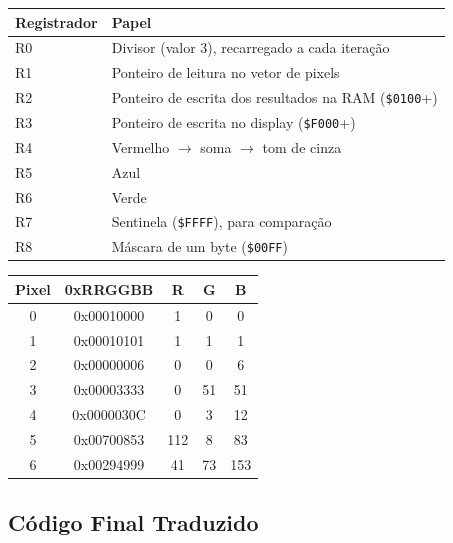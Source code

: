 \documentclass[12pt, a4paper]{article}
\begin{document}
\begin{table}[h!]
\centering
\begin{tabularx}{\textwidth}{lX}
  \toprule
  \textbf{Registrador} & \textbf{Papel} \\
  \midrule
  R0 & Divisor (valor 3), recarregado a cada iteração \\
  R1 & Ponteiro de leitura no vetor de pixels \\
  R2 & Ponteiro de escrita dos resultados na RAM (\texttt{\$0100}+) \\
  R3 & Ponteiro de escrita no display (\texttt{\$F000}+) \\
  R4 & Vermelho $\rightarrow$ soma $\rightarrow$ tom de cinza \\
  R5 & Azul \\
  R6 & Verde \\
  R7 & Sentinela (\texttt{\$FFFF}), para comparação \\
  R8 & Máscara de um byte (\texttt{\$00FF}) \\
  \bottomrule
\end{tabularx}
\end{table}

\begin{table}[h!]
\centering
\begin{tabular}{ccccc}
  \toprule
  \textbf{Pixel} & \textbf{0xRRGGBB} & \textbf{R} & \textbf{G} & \textbf{B} \\
  \midrule
  0 & 0x00010000 & 1   & 0  & 0   \\
  1 & 0x00010101 & 1   & 1  & 1   \\
  2 & 0x00000006 & 0   & 0  & 6   \\
  3 & 0x00003333 & 0   & 51 & 51  \\
  4 & 0x0000030C & 0   & 3  & 12  \\
  5 & 0x00700853 & 112 & 8  & 83  \\
  6 & 0x00294999 & 41  & 73 & 153 \\
  \bottomrule
\end{tabular}
\end{table}

\subsection{Código Final Traduzido}
\end{document}
